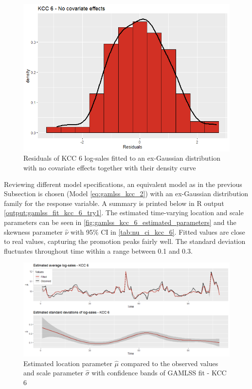 \begin{figure}[H]
\centering
  \includegraphics[width=0.45\linewidth]{figures/res_kcc_6_no_covariates.png}
  \caption{Residuals of KCC 6 log-sales fitted to an ex-Gaussian distribution with no covariate effects together with their density curve}
  \label{fig:res_kcc_6_no_covariates}
\end{figure}


Reviewing different model specifications, an equivalent model as in the previous Subsection is chosen (Model \ref{eq:gamlss_kcc_2}) with an ex-Gaussian distribution family for the response variable. A summary is printed below in R output \ref{output:gamlss_fit_kcc_6_try1}.
The estimated time-varying location and scale parameters can be seen in \autoref{fig:gamlss_kcc_6_estimated_parameters} and the skewness parameter $\hat{\nu}$ with 95\% CI in \autoref{tab:nu_ci_kcc_6}. Fitted values are close to real values, capturing the promotion peaks fairly well. The standard deviation fluctuates throughout time within a range between 0.1 and 0.3.
\\






\begin{figure}[H]
\centering
  \includegraphics[width=0.95\linewidth]{figures/gamlss_kcc_6_estimated_parameters.png}
  \caption{Estimated location parameter $\hat{\mu}$ compared to the observed values and scale parameter $\hat{\sigma}$ with confidence bands of GAMLSS fit - KCC 6}
  \label{fig:gamlss_kcc_6_estimated_parameters}
\end{figure}



